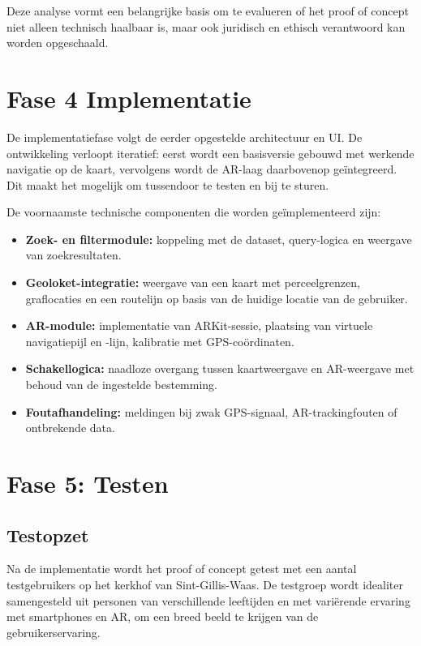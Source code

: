 Deze analyse vormt een belangrijke basis om te evalueren of het proof of concept niet alleen technisch haalbaar is, maar ook juridisch en ethisch verantwoord kan worden opgeschaald.

\section{Fase 4 Implementatie}

De implementatiefase volgt de eerder opgestelde architectuur en UI. De ontwikkeling verloopt iteratief: eerst wordt een basisversie gebouwd met werkende navigatie op de kaart, vervolgens wordt de AR-laag daarbovenop geïntegreerd. Dit maakt het mogelijk om tussendoor te testen en bij te sturen.

De voornaamste technische componenten die worden geïmplementeerd zijn:

\begin{itemize}
    \item \textbf{Zoek- en filtermodule:} koppeling met de dataset, query-logica en weergave van zoekresultaten.
    \item \textbf{Geoloket-integratie:} weergave van een kaart met perceelgrenzen, graflocaties en een routelijn op basis van de huidige locatie van de gebruiker.
    \item \textbf{AR-module:} implementatie van ARKit-sessie, plaatsing van virtuele navigatiepijl en -lijn, kalibratie met GPS-coördinaten.
    \item \textbf{Schakellogica:} naadloze overgang tussen kaartweergave en AR-weergave met behoud van de ingestelde bestemming.
    \item \textbf{Foutafhandeling:} meldingen bij zwak GPS-signaal, AR-trackingfouten of ontbrekende data.
\end{itemize}

\section{Fase 5: Testen}

\subsection{Testopzet}

Na de implementatie wordt het proof of concept getest met een aantal testgebruikers op het kerkhof van Sint-Gillis-Waas. De testgroep wordt idealiter samengesteld uit personen van verschillende leeftijden en met variërende ervaring met smartphones en AR, om een breed beeld te krijgen van de gebruikerservaring.

